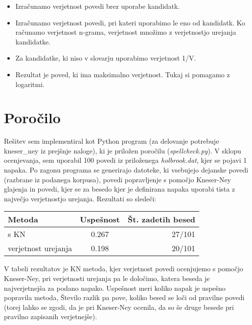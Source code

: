 \documentclass[a4paper,11pt]{article}
\begin{document}
\begin{itemize}
        \begin{itemize}
        \item Izračunamo verjetnost povedi brez uporabe kandidatk.
        \item Izračunamo verjetnost povedi, pri kateri uporabimo le eno od kandidatk. Ko računamo verjetnost n-grama, verjetnost množimo z verjetnostjo urejanja kandidatke.
        \item Za kandidatke, ki niso v slovarju uporabimo verjetnost 1/V.
        \item Rezultat je poved, ki ima maksimalno verjetnost. Tukaj si pomagamo z logaritmi.
		\end{itemize}
\end{itemize}

\section{Poročilo}

Rešitev sem implementiral kot Python program (za delovanje potrebuje kneser\_ney iz prejšnje naloge), ki je priložen poročilu (\textit{spellcheck.py}). V sklopu ocenjevanja, sem uporabil 100 povedi iz priloženega \textit{holbrook.dat}, kjer se pojavi 1 napaka. Po zagonu programa se generirajo datoteke, ki vsebujejo dejanske povedi (razbrane iz podanega korpusa), povedi popravljenje s pomočjo Kneser-Ney glajenja in povedi, kjer se za besedo kjer je definirana napaka uporabi tista z največjo verjetnostjo urejanja. Rezultati so sledeči:

\begin{center}
  \begin{tabular}{ | l | c | r |}
    \hline
    Metoda 				& Uspešnost 	& Št. zadetih besed \\ \hline
    s KN 				& 0.267		& 27/101 \\ \hline
    verjetnost urejanja 	& 0.198		& 20/101 \\ \hline
 
  \end{tabular}
\end{center}
V tabeli rezultatov je KN metoda, kjer verjetnost povedi ocenjujemo s pomočjo Kneser-Ney, pri verjetnosti urejanja pa le določimo, katera beseda je najverjetnejša za podano napako. Uspešnost meri koliko napak je uspešno popravila metoda, Število razlik pa pove, koliko besed se loči od pravilne povedi (torej lahko se zgodi, da je pri Kneser-Ney ocenila, da so še druge besede pri pravilno zapisanih verjetnejše).
\end{document}
